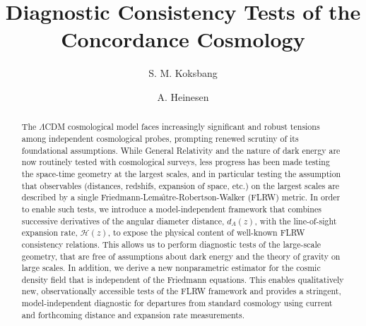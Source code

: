 \documentclass[reprint,aps,prd,nofootinbib,a4paper,10pt,twocolumn,superscriptaddress]{revtex4-2}
\begin{document}
\title{Diagnostic Consistency Tests of the Concordance Cosmology}



\author{S. M. Koksbang}
\author{A. Heinesen}



\begin{abstract}
The $\Lambda$CDM cosmological model faces increasingly significant and robust tensions among independent cosmological probes, prompting renewed scrutiny of its foundational assumptions. While General Relativity and the nature of dark energy are now routinely tested with cosmological surveys, less progress has been made testing the space-time geometry at the largest scales, and in particular testing the assumption that observables (distances, redshifs, expansion of space, etc.) on the largest scales are described by a single Friedmann-Lema\^{\i}tre-Robertson-Walker (FLRW) metric.
In order to enable such tests, we introduce a model-independent framework that combines successive derivatives of the angular diameter distance, $d_A(z)$, with the line-of-sight expansion rate, $\mathcal{H}(z)$, to expose the physical content of well-known FLRW consistency relations. This allows us to perform diagnostic tests of the large-scale geometry, that are free of assumptions about dark energy and the theory of gravity on large scales. In addition, we derive a new nonparametric estimator for the cosmic density field that is independent of the Friedmann equations. This enables qualitatively new, observationally accessible tests of the FLRW framework and provides a stringent, model-independent diagnostic for departures from standard cosmology using current and forthcoming distance and expansion rate measurements.
\end{abstract}

\maketitle
\end{document}
